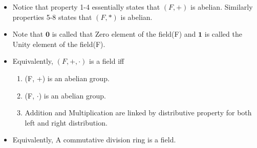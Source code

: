 \documentclass[twoside]{article}
\begin{document}
\begin{itemize}
\begin{enumerate}
		\end{enumerate}
		\item Notice that property 1-4 essentially states that $(F,+)$ is abelian. Similarly properties 5-8 states that $(F,*)$ is abelian.
		\item Note that $\mathbf{0}$ is called that Zero element of the field(F) and $\mathbf{1}$ is called the Unity element of the field(F).
		\item Equivalently, $(F, +, \cdot)$ is a field iff
		\begin{enumerate}
			\item (F, +) is an abelian group.
			\item (F, $\cdot$) is an abelian group.
			\item Addition and Multiplication are linked by distributive property for both left and right distribution.
		\end{enumerate}
		\item Equivalently, A commutative division ring is a field.
	\end{itemize}
\end{document}
